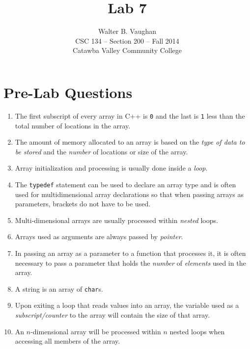 \documentclass[11pt]{article}
\author{Walter B. Vaughan\\
        \small CSC 134 -- Section 200 -- Fall 2014\\
        \small Catawba Valley Community College}
\title{Lab 7}
\date{\vspace{-5ex}}
\begin{document}
\maketitle


\section*{Pre-Lab Questions}
\begin{enumerate}
    \item The first subscript of every array in C++ is \texttt{0} and the last is \texttt{1} less than the total number of locations in the array.

    \item The amount of memory allocated to an array is based on the \emph{type of data to be stored} and the \emph{number} of locations or size of the array.

    \item Array initialization and processing is usually done inside a \emph{loop}.

    \item The \lstinline{typedef} statement can be used to declare an array type and is often used for multidimensional array declarations so that when passing arrays as parameters, brackets do not have to be used.
    \item Multi-dimensional arrays are usually processed within \emph{nested} loops.

    \item Arrays used as arguments are always passed by \emph{pointer}.


    \item In passing an array as a parameter to a function that processes it, it is often necessary to pass a parameter that holds the \emph{number} of \emph{elements} used in the array.

    \item A string is an array of \lstinline{char}s.

    \item Upon exiting a loop that reads values into an array, the variable used as a \emph{subscript/counter} to the array will contain the size of that array.

    \item An $n$-dimensional array will be processed within $n$ nested loops when accessing all members of the array.
\end{enumerate}
\newpage
\end{document}
